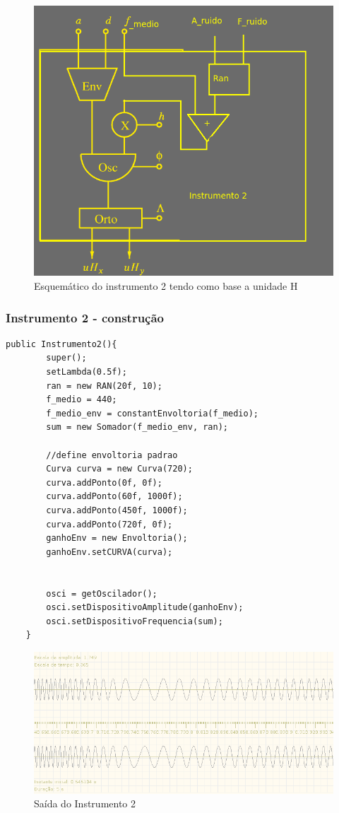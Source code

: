\documentclass{beamer}
\begin{document}
\begin{frame}
 \begin{figure}
  \includegraphics[scale=0.4]{./images/instrumento2.png}
  \caption{Esquemático do instrumento 2 tendo como base a unidade H}
 \end{figure} 
\end{frame}
 \begin{frame}[fragile]
 \frametitle{Instrumento 2 - construção}
 	\begin{lstlisting}
public Instrumento2(){
		super();
		setLambda(0.5f);
		ran = new RAN(20f, 10);
		f_medio = 440;
		f_medio_env = constantEnvoltoria(f_medio);
		sum = new Somador(f_medio_env, ran);

		//define envoltoria padrao
		Curva curva = new Curva(720);
		curva.addPonto(0f, 0f);
		curva.addPonto(60f, 1000f);
		curva.addPonto(450f, 1000f);
		curva.addPonto(720f, 0f);
		ganhoEnv = new Envoltoria();
		ganhoEnv.setCURVA(curva);

		
		osci = getOscilador();
		osci.setDispositivoAmplitude(ganhoEnv);
		osci.setDispositivoFrequencia(sum);
	}
	    			\end{lstlisting}
\end{frame}

\begin{frame}
 \begin{figure}
  \includegraphics[scale=0.4]{./images/ins2.png}
  \caption{Saída do Instrumento 2}
 \end{figure} 
\end{frame}
\end{document}
